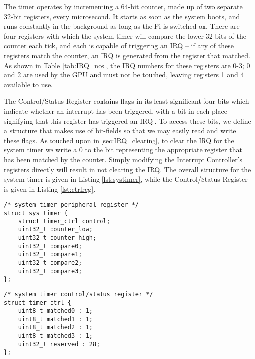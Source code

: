     The timer operates by incrementing a 64-bit counter, made up of two separate
    32-bit registers, every microsecond. It starts as soon as the system boots,
    and runs constantly in the background as long as the Pi is switched on.
    There are four registers with which the system timer will compare the lower
    32 bits of the counter each tick, and each is capable of triggering an IRQ
    -- if any of these registers match the counter, an IRQ is generated from
    the register that matched. As shown in Table \ref{tab:IRQ_nos}, the IRQ
    numbers for these registers are 0-3; 0 and 2 are used by the GPU and must
    not be touched, leaving registers 1 and 4 available to use.

    The Control/Status Register contains flags in its least-significant four
    bits which indicate whether an interrupt has been triggered, with a bit in
    each place signifying that this register has triggered an IRQ
    \cite[pg.~173]{BCM2835}. To access these bits, we define a structure that
    makes use of bit-fields so that we may easily read and write these flags. As
    touched upon in \ref{sec:IRQ_clearing}, to clear the IRQ for the system
    timer we write a 0 to the bit representing the appropriate register that has
    been matched by the counter. Simply modifying the Interrupt Controller's
    registers directly will result in not clearing the IRQ. The overall
    structure for the system timer is given in Listing \ref{lst:systimer}, while
    the Control/Status Register is given in Listing \ref{lst:ctrlreg}.

    \lstset{language=c}
    \begin{lstlisting}[caption={The System
    Timer},captionpos=b,label={lst:systimer}]
/* system timer peripheral register */
struct sys_timer {
    struct timer_ctrl control;
    uint32_t counter_low;
    uint32_t counter_high;
    uint32_t compare0;
    uint32_t compare1;
    uint32_t compare2;
    uint32_t compare3;
};
    \end{lstlisting}

    \lstset{language=c}
    \begin{lstlisting}[caption={The Control/Status
    Register},captionpos=b,label={lst:ctrlreg}]
/* system timer control/status register */
struct timer_ctrl {
    uint8_t matched0 : 1;
    uint8_t matched1 : 1;
    uint8_t matched2 : 1;
    uint8_t matched3 : 1;
    uint32_t reserved : 28;
};
    \end{lstlisting}

